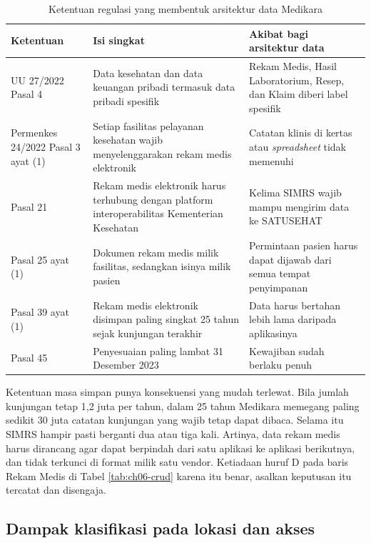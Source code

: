 \begin{table}[!htb]
  \centering
  \caption{Ketentuan regulasi yang membentuk arsitektur data Medikara}
  \label{tab:ch06-kewajiban}
  \begin{tabularx}{\textwidth}{lXX}
    \hline
    \textbf{Ketentuan} & \textbf{Isi singkat} & \textbf{Akibat bagi arsitektur
      data} \\
    \hline
    UU 27/2022 Pasal 4 & Data kesehatan dan data keuangan pribadi termasuk data
      pribadi spesifik & Rekam Medis, Hasil Laboratorium, Resep, dan Klaim diberi
      label spesifik \\
    \hline
    Permenkes 24/2022 Pasal 3 ayat (1) & Setiap fasilitas pelayanan kesehatan
      wajib menyelenggarakan rekam medis elektronik & Catatan klinis di kertas
      atau \textit{spreadsheet} tidak memenuhi \\
    \hline
    Pasal 21 & Rekam medis elektronik harus terhubung dengan platform
      interoperabilitas Kementerian Kesehatan & Kelima SIMRS wajib mampu
      mengirim data ke SATUSEHAT \\
    \hline
    Pasal 25 ayat (1) & Dokumen rekam medis milik fasilitas, sedangkan isinya
      milik pasien & Permintaan pasien harus dapat dijawab dari semua tempat
      penyimpanan \\
    \hline
    Pasal 39 ayat (1) & Rekam medis elektronik disimpan paling singkat 25 tahun
      sejak kunjungan terakhir & Data harus bertahan lebih lama daripada
      aplikasinya \\
    \hline
    Pasal 45 & Penyesuaian paling lambat 31 Desember 2023 & Kewajiban sudah
      berlaku penuh \\
    \hline
  \end{tabularx}
\end{table}

Ketentuan masa simpan punya konsekuensi yang mudah terlewat. Bila jumlah
kunjungan tetap 1,2 juta per tahun, dalam 25 tahun Medikara memegang paling
sedikit 30 juta catatan kunjungan yang wajib tetap dapat dibaca. Selama itu
SIMRS hampir pasti berganti dua atau tiga kali. Artinya, data rekam medis
harus dirancang agar dapat berpindah dari satu aplikasi ke aplikasi
berikutnya, dan tidak terkunci di format milik satu vendor. Ketiadaan huruf D
pada baris Rekam Medis di Tabel \ref{tab:ch06-crud} karena itu benar, asalkan
keputusan itu tercatat dan disengaja.

\subsection*{Dampak klasifikasi pada lokasi dan akses}

